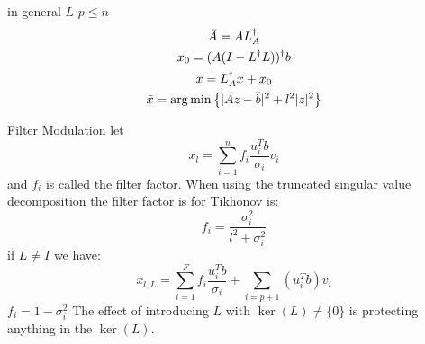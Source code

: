 in general $L$ $p\leq n$
\begin{gather*}
\bar A = AL^\dagger _A \\
x_0 = (A(I-L^\dagger L))^\dagger b\\
x= L_A^\dagger \bar x + x_0 \\
\bar x = \operatorname*{arg\,min} \left \{|\bar A z - \bar b |^2 + l^2 |z|^2 \right \}
\end{gather*}

Filter Modulation let 
$$x_l = \sum_{i=1}^n f_i \frac{u_i^T b}{\sigma_i} v_i$$
and $f_i$ is called the filter factor. When using the truncated singular value decomposition the filter factor is for Tikhonov is:
$$f_i = \frac{\sigma_i^2}{l^2 + \sigma_i^2}$$
if $L\neq I$ we have:
$$x_{l,L} = \sum _{i=1}^F f_i \frac{u_i^T b}{\sigma_i} + \sum_{i=p+1} (u_i^T b) v_i$$
$f_i=1-\sigma_i^2$ The effect of introducing $L$ with $\ker(L)\neq \{0\}$ is protecting anything in the $\ker(L)$.
